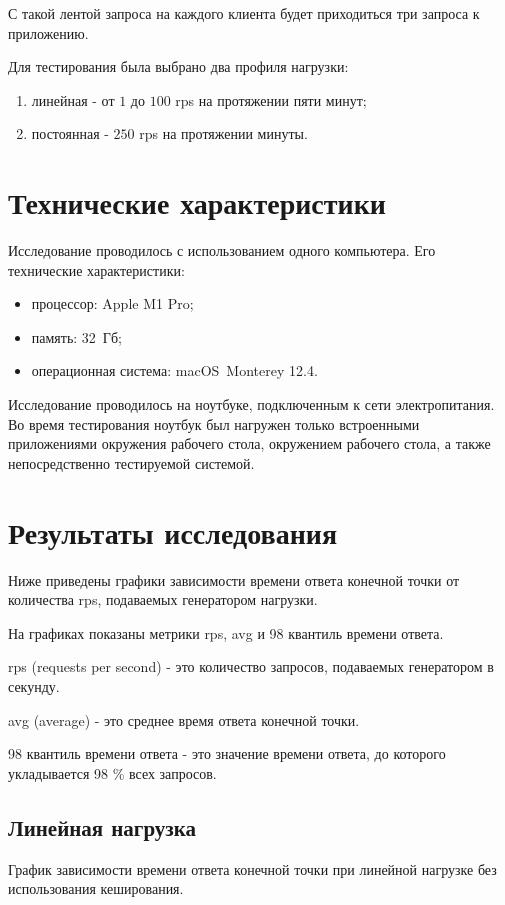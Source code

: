 
С такой лентой запроса на каждого клиента будет приходиться три запроса к приложению. 

Для тестирования была выбрано два профиля нагрузки:
\begin{enumerate}
	\item линейная - от $1$ до $100$ rps на протяжении пяти минут;
	\item постоянная - $250$ rps на протяжении минуты.
\end{enumerate}



\section{Технические характеристики}
Исследование проводилось с использованием одного компьютера.
Его технические характеристики:
\begin{itemize}
	\item процессор: Apple M1 Pro;
	\item память: 32~Гб;
	\item операционная система: macOS~Monterey \cite{monterey} 12.4.
\end{itemize}

Исследование проводилось на ноутбуке, подключенным к сети электропитания. Во время тестирования ноутбук был нагружен только встроенными приложениями окружения рабочего стола, окружением рабочего стола, а также непосредственно тестируемой системой.

\newpage

\section{Результаты исследования}
Ниже приведены графики зависимости времени ответа конечной точки от количества rps, подаваемых генератором нагрузки.  

На графиках показаны метрики rps, avg и 98 квантиль времени ответа.

rps (requests per second) - это количество запросов, подаваемых генератором в секунду.  

avg (average) -  это среднее время ответа конечной точки.  

98 квантиль времени ответа - это значение времени ответа, до которого укладывается 98 \% всех запросов.

\subsection{Линейная нагрузка}
График зависимости времени ответа конечной точки при линейной нагрузке без использования кеширования.   

